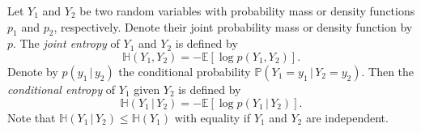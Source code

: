 \documentclass[smallextended]{svjour3}
\makeatletter
\renewcommand*{\eqref}[1]{%
  \hyperref[{#1}]{\textup{\tagform@{\ref*{#1}}}}%
}
\renewcommand{\P}{\mathbb{P}}
\newcommand{\E}{\mathbb{E}}
\renewcommand{\H}{\mathbb{H}}
\newcommand{\suml}{\sum\limits}
\newcommand{\ie}{i.e.}
\makeatother
\begin{document}
Let $Y_1$ and $Y_2$ be two random variables with probability mass or density functions $p_1$ and $p_2$, respectively.
Denote their joint probability mass or density function by $p$.
The \emph{joint entropy} of $Y_1$ and $Y_2$ is defined by
\begin{equation*}
	\H(Y_1,Y_2) = -\E\left[\log p(Y_1,Y_2)\right].
\end{equation*}
Denote by $p(y_1\,|\,y_2)$ the conditional probability $\P(Y_1=y_1\,|\,Y_2=y_2)$.
Then the \emph{conditional entropy} of $Y_1$ given $Y_2$ is defined by
\begin{equation*}
	\H(Y_1\,|\,Y_2) = -\E\left[\log p(Y_1\,|\,Y_2)\right].
\end{equation*}
Note that $\H(Y_1\,|\,Y_2) \leq \H(Y_1)$ with equality if $Y_1$ and $Y_2$ are independent.

% 
% 
\end{document}

